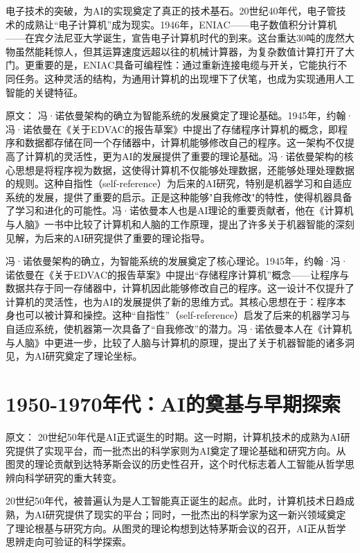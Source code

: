 电子技术的突破，为AI的实现奠定了真正的技术基石。20世纪40年代，电子管技术的成熟让“电子计算机”成为现实。1946年，ENIAC——电子数值积分计算机——在宾夕法尼亚大学诞生，宣告电子计算机时代的到来。这台重达30吨的庞然大物虽然能耗惊人，但其运算速度远超以往的机械计算器，为复杂数值计算打开了大门。更重要的是，ENIAC具备可编程性：通过重新连接电缆与开关，它能执行不同任务。这种灵活的结构，为通用计算机的出现埋下了伏笔，也成为实现通用人工智能的关键特征。

原文：
冯·诺依曼架构的确立为智能系统的发展奠定了理论基础。1945年，约翰·冯·诺依曼在《关于EDVAC的报告草案》中提出了存储程序计算机的概念，即程序和数据都存储在同一个存储器中，计算机能够修改自己的程序。这一架构不仅提高了计算机的灵活性，更为AI的发展提供了重要的理论基础。冯·诺依曼架构的核心思想是将程序视为数据，这使得计算机不仅能够处理数据，还能够处理处理数据的规则。这种自指性（self-reference）为后来的AI研究，特别是机器学习和自适应系统的发展，提供了重要的启示。正是这种能够"自我修改"的特性，使得机器具备了学习和进化的可能性。冯·诺依曼本人也是AI理论的重要贡献者，他在《计算机与人脑》一书中比较了计算机和人脑的工作原理，提出了许多关于机器智能的深刻见解，为后来的AI研究提供了重要的理论指导。

冯·诺依曼架构的确立，为智能系统的发展奠定了核心理论。1945年，约翰·冯·诺依曼在《关于EDVAC的报告草案》中提出“存储程序计算机”概念——让程序与数据共存于同一存储器中，计算机因此能够修改自己的程序。这一设计不仅提升了计算机的灵活性，也为AI的发展提供了新的思维方式。其核心思想在于：程序本身也可以被计算和操控。这种“自指性”（self-reference）启发了后来的机器学习与自适应系统，使机器第一次具备了“自我修改”的潜力。冯·诺依曼本人在《计算机与人脑》中更进一步，比较了人脑与计算机的原理，提出了关于机器智能的诸多洞见，为AI研究奠定了理论坐标。

\section{1950-1970年代：AI的奠基与早期探索}

原文：
20世纪50年代是AI正式诞生的时期。这一时期，计算机技术的成熟为AI研究提供了实现平台，而一批杰出的科学家则为AI奠定了理论基础和研究方向。从图灵的理论贡献到达特茅斯会议的历史性召开，这个时代标志着人工智能从哲学思辨向科学研究的重大转变。

20世纪50年代，被普遍认为是人工智能真正诞生的起点。此时，计算机技术日趋成熟，为AI研究提供了现实的平台；同时，一批杰出的科学家为这一新兴领域奠定了理论根基与研究方向。从图灵的理论构想到达特茅斯会议的召开，AI正从哲学思辨走向可验证的科学探索。

